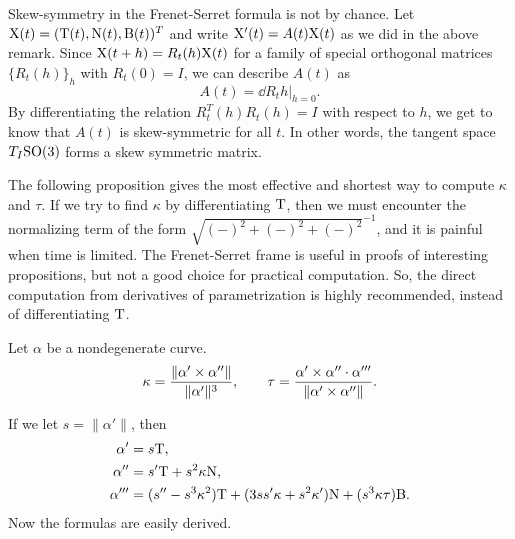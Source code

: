 \documentclass{../exp}
\def\a{\alpha}
\begin{document}
\begin{rmk}
Skew-symmetry in the Frenet-Serret formula is not by chance.
Let $\mathrm{X}(t)=(\mathrm{T}(t),\mathrm{N}(t),\mathrm{B}(t))^T$ and write $\mathrm{X}'(t)=A(t)\mathrm{X}(t)$ as we did in the above remark.
Since $\mathrm{X}(t+h)=R_t(h)\mathrm{X}(t)$ for a family of special orthogonal matrices $\{R_t(h)\}_h$ with $R_t(0)=I$, we can describe $A(t)$ as 
\[A(t)=\left.\dd{R_t}{h}\right\rvert_{h=0}.\]
By differentiating the relation $R_t^T(h)R_t(h)=I$ with respect to $h$, we get to know that $A(t)$ is skew-symmetric for all $t$.
In other words, the tangent space $T_I\mathrm{SO}(3)$ forms a skew symmetric matrix.
\end{rmk}

The following proposition gives the most effective and shortest way to compute $\kappa$ and $\tau$.
If we try to find $\kappa$ by differentiating $\mathrm{T}$, then we must encounter the normalizing term of the form $\sqrt{(-)^2+(-)^2+(-)^2}^{-1}$, and it is painful when time is limited.
The Frenet-Serret frame is useful in proofs of interesting propositions, but not a good choice for practical computation.
So, the direct computation from derivatives of parametrization is highly recommended, instead of differentiating $\mathrm{T}$.
\begin{prop}
Let $\a$ be a nondegenerate curve.
\[\kappa=\frac{\|\a'\x\a''\|}{\|\a'\|^3},\qquad\tau=\frac{\a'\x\a''\cdot\a'''}{\|\a'\x\a''\|}.\]
\end{prop}
\begin{pf}
If we let $s=\|\a'\|$, then
\begin{align*}
\a'&=s\rT,\\
\a''&=s'\rT+s^2\kappa\rN,\\
\a'''&=(s''-s^3\kappa^2)\rT+(3ss'\kappa+s^2\kappa')\rN+(s^3\kappa\tau)\rB.
\end{align*}
Now the formulas are easily derived.
\end{pf}
\end{document}
